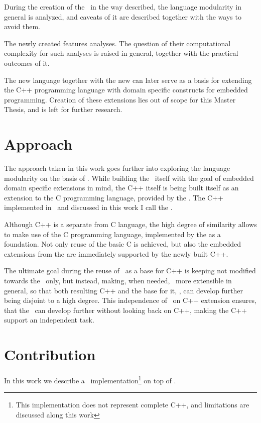 During the creation of the \cpppl\ in the way described, the language modularity in general is analyzed, and caveats of it
are described together with the ways to avoid them.

The newly created  features analyses. The question of their computational complexity for such analyses 
is raised in general, together with the practical outcomes of it.

The new language together with the new  can later serve as a basis for extending the C++ programming 
language with domain specific constructs for embedded programming. Creation of these extensions lies out of scope
for this Master Thesis, and is left for further research.

\section{Approach}
The approach taken in this work goes further into exploring the language modularity on the basis of \jbmps. While building 
the \cpppl\ itself  with the goal of embedded domain specific extensions in mind, the C++ itself is being built itself as 
an extension to the C programming language, provided by the . The C++ implemented in \jbmps\ and discussed in this 
work I call the \pcpp.

Although C++ is a separate from C language, the high degree of similarity allows to make use of the C programming language,
implemented by the  as a foundation. Not only reuse of the basic C is achieved, but also the embedded extensions from
the  are immediately supported by the newly built C++.

The ultimate goal during the reuse of \mbdr\ as a base for C++ is keeping 
not modified towards the \cpppl\ only, but instead, making, when needed, \mbeddr\  more extensible in general, 
so that both resulting C++ and the base for it, \mbdr,  can develop further being disjoint to a high degree.
This independence of \mbdr\ on C++ extension ensures, that the \mbdp\ can develop further without looking back 
on C++, making the C++ support an independent task.

\section{Contribution}

In this work we describe a \cpppl\ implementation\footnote{This implementation does not represent complete C++, and
limitations are discussed along this work} on top of \mbdp.

